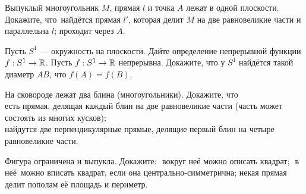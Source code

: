\documentclass[a4paper,12pt]{article}
\begin{document}



 Выпуклый многоугольник $M$, прямая $l$ и точка $A$ лежат в одной
плоскости. Докажите, что~най\-д\"ет\-ся прямая $l'$, которая
делит $M$ на две равновеликие части и
 параллельна $l$;
 проходит через $A$.


 Пусть $S^1$ --- окружность на плоскости.
Дайте определение
непрерывной функции $f:S^1\rightarrow\mathbb{R}$.
Пусть $f:S^1\rightarrow\mathbb{R}$ непрерывна.
Докажите, что %
у $S^1$ найд\"ется такой диаметр $AB$, что
$f(A)=f(B)$.

 На сковороде лежат два блина (многоугольники). Докажите, что\\
есть прямая, делящая каждый блин на две равновеликие части
(часть может состоять из многих кусков);\\
найдутся две перпендикулярные прямые, делящие первый блин
на четыре равновеликие части.


Фигура ограничена и выпукла. Докажите: $\!\!\!\!$
 вокруг неё можно описать квадрат;     $\!\!\!\!$
 в неё~можно вписать квадрат, если она центрально-симметрична;
 некая прямая делит пополам её площадь и периметр.






%
\end{document}
